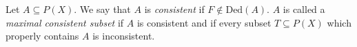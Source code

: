 Let $A \subseteq P(X)$. We say that $A$ is \emph{consistent} if $F \notin \text{Ded}(A)$. $A$ is called a \emph{maximal consistent subset} if $A$ is consistent and if every subset $T \subseteq P(X)$ which properly contains $A$ is inconsistent.
